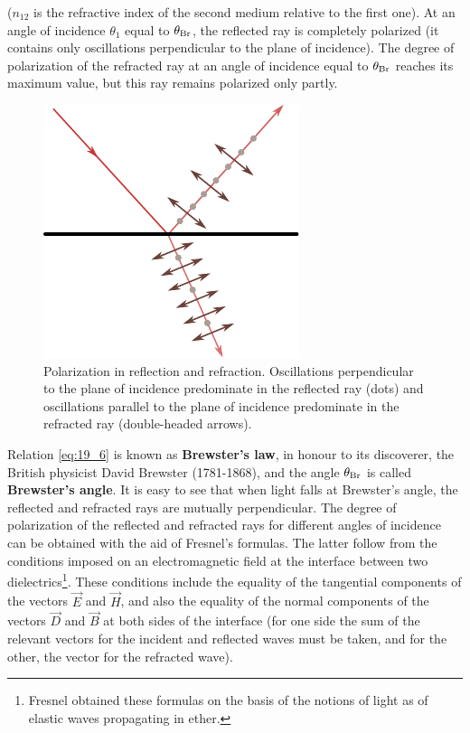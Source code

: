 \noindent
($n_{12}$ is the refractive index of the second
medium relative to the first one).
At an angle of incidence $\theta_1$ equal to $\theta_{\text{Br}}$, the  reflected ray is completely polarized (it contains only oscillations perpendicular to the plane of incidence).
The degree of polarization of the refracted ray at an angle of incidence equal to $\theta_{\text{Br}}$ reaches its maximum value, but this ray remains polarized only partly.

\begin{figure}[t]
	\begin{center}
		\includegraphics[scale=0.85]{figures/ch_19/fig_19_6.pdf}
        \caption[]{Polarization in reflection and refraction. Oscillations perpendicular to the plane of incidence predominate in the reflected ray (dots) and oscillations parallel to the plane of incidence predominate in the refracted ray (double-headed arrows).}
		\label{fig:19_6}
	\end{center}
	\vspace{-1cm}
\end{figure}

Relation \eqref{eq:19_6} is known as \textbf{Brewster's law}, in honour to its discoverer, the British physicist David Brewster (1781-1868), and the angle $\theta_{\text{Br}}$ is called \textbf{Brewster's angle}.
It is easy to see that when light falls at Brewster's angle, the reflected and refracted rays are mutually perpendicular.
The degree of polarization of the reflected and refracted rays for different angles of incidence can be obtained with the aid of Fresnel's formulas.
The latter follow from the conditions imposed on an electromagnetic field at the interface between two dielectrics\footnote{Fresnel obtained these formulas on the basis of the notions of light as of elastic waves propagating in ether.}.
These conditions include the equality of the tangential components of the vectors $\vec{E}$ and $\vec{H}$, and also the equality of the normal components of the vectors $\vec{D}$ and $\vec{B}$ at both sides of the interface (for one
side the sum of the relevant vectors for the incident and reflected waves must be taken, and for the other, the vector for the refracted
wave).

